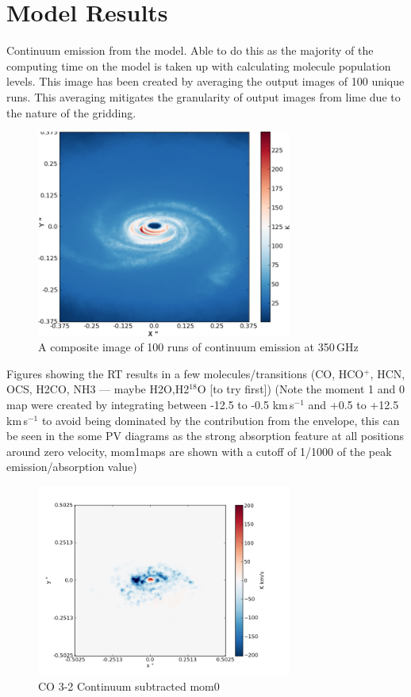 \documentclass[useAMS,usenatbib]{mn2e}
\begin{document}
\section{Model Results}

Continuum emission from the model. Able to do this as the majority of the computing time on the model is taken up with calculating molecule population levels. This image has been created by averaging the output images of 100 unique runs. This averaging mitigates the granularity of output images from lime due to the nature of the gridding. 

\begin{figure}
 \includegraphics[width=84mm]{Figures/sim/continuum.png}

 \caption{A composite image of 100 runs of continuum emission at 350$\,$GHz}
\end{figure}

Figures showing the RT results in a few molecules/transitions (CO, HCO$^+$, HCN, OCS, H2CO, NH3 --- maybe H2O,H2$^{18}$O [to try first]) (Note the moment 1 and 0 map were created by integrating between -12.5 to -0.5 km$\,$s$^{-1}$ and +0.5 to +12.5 km$\,$s$^{-1}$ to avoid being dominated by the contribution from the envelope, this can be seen in the some PV diagrams as the strong absorption feature at all positions around zero velocity, mom1maps are shown with a cutoff of 1/1000 of the peak emission/absorption value)\newline

\begin{figure}
 \includegraphics[width=84mm]{Figures/sim/imageCO_3-2_30deg_contSub.png}

 \caption{CO 3-2 Continuum subtracted mom0}
\end{figure}
\end{document}
